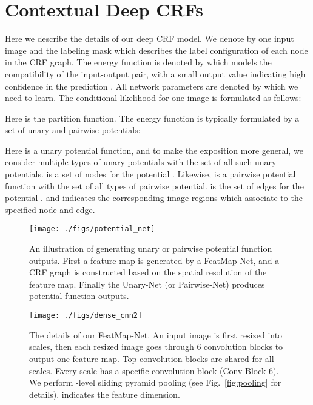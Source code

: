 \section{Contextual Deep CRFs}
\label{sec:crf_details}

Here we describe the details of our deep CRF model.
We denote by  one input image and  the labeling mask which describes the label configuration of each node in the CRF graph.
The energy function is denoted by  which models the compatibility of the input-output pair, with a small output value indicating high confidence in the prediction .
All network parameters are denoted by  which we need to learn.
The conditional likelihood for one image is formulated as follows:

Here  is the partition function.
The energy function is typically formulated by a set of unary and pairwise potentials:

Here  is a unary potential function,
and to make the exposition more general, we consider multiple types of unary potentials with
 the set of all such unary potentials.
 is a set of nodes for the potential .
Likewise,  is a pairwise potential function
 with  the set of all types of pairwise potential.  is the set of edges for the potential .
 and   indicates the corresponding image regions which associate to the specified node and edge.












\begin{figure}[t]
	\centering
	\texttt{[image: ./figs/potential\_net]}
\caption{An illustration of generating unary or pairwise potential function outputs.
First a feature map is generated by a FeatMap-Net, and a CRF graph is constructed based on the spatial resolution of the feature map.
Finally the Unary-Net (or Pairwise-Net) produces potential function outputs.}
\label{fig:potential_net}
\end{figure}





\begin{figure*}[t]
	\center
	\texttt{[image: ./figs/dense\_cnn2]}
\caption{The details of our FeatMap-Net.
An input image is first resized into  scales,
then each resized image goes through 6 convolution blocks to output one feature map.
Top  convolution blocks are shared for all scales. Every scale has a specific convolution block (Conv Block 6).
We perform -level sliding pyramid pooling (see Fig.~\ref{fig:pooling} for details).
 indicates the feature dimension.
}
\label{fig:featmapnet}
\end{figure*}







